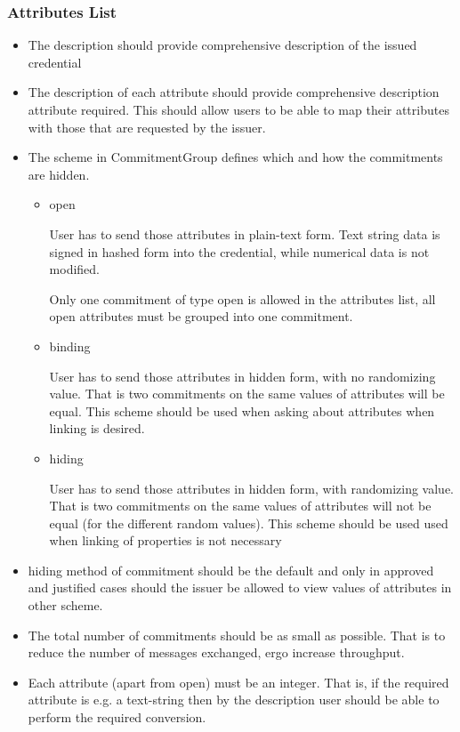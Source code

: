 \subsubsection*{Attributes List}
\begin{itemize}[label=$\circ$]
    \item The \textsf{description} should provide comprehensive description of the issued credential
    
    \item The \textsf{description} of each attribute should provide comprehensive description attribute required. This should allow users to be able to map their attributes with those that are requested by the issuer.
    
    \item The \textsf{scheme} in \textsf{CommitmentGroup} defines which and how the commitments are hidden. 
    
    \begin{itemize}
        \item \textsf{open}
        
        User has to send those attributes in plain-text form. Text string data is signed in hashed form into the credential, while numerical data is not modified.

        Only one commitment of type \textsf{open} is allowed in the attributes list, all open attributes must be grouped into one commitment.
        
        \item \textsf{binding}
        
        User has to send those attributes in hidden form, with no randomizing value. That is two commitments on the same values of attributes will be equal. This scheme should be used when asking about attributes when linking is desired.
        
        \item \textsf{hiding}
        
        User has to send those attributes in hidden form, with randomizing value. That is two commitments on the same values of attributes will not be equal (for the different random values). This scheme should be used used when linking of properties is not necessary 
    \end{itemize}
    
    \item \textsf{hiding} method of commitment should be the default and only in approved and justified cases should the issuer be allowed to view values of attributes in other scheme.
    
    \item The total number of commitments should be as small as possible. That is to reduce the number of messages exchanged, ergo increase throughput.
    
    \item Each attribute (apart from \textsf{open}) must be an integer. That is, if the required attribute is e.g. a text-string then by the \textsf{description} user should be able to perform the required conversion.

\end{itemize}

